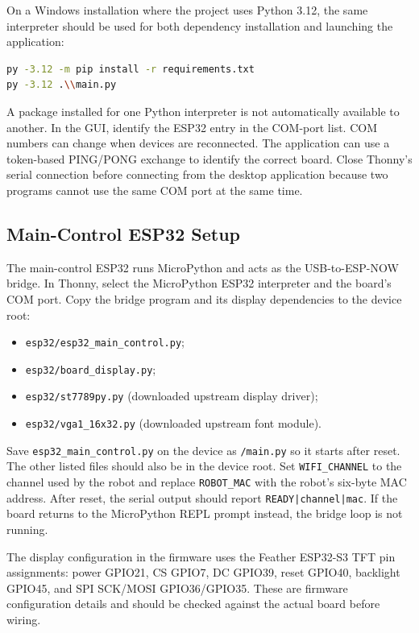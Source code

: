 \documentclass{article}
\begin{document}
On a Windows installation where the project uses Python 3.12, the same interpreter should be used for both dependency installation and launching the application:

\begin{lstlisting}[language=bash]
py -3.12 -m pip install -r requirements.txt
py -3.12 .\\main.py
\end{lstlisting}

A package installed for one Python interpreter is not automatically available to another. In the GUI, identify the ESP32 entry in the COM-port list. COM numbers can change when devices are reconnected. The application can use a token-based PING/PONG exchange to identify the correct board. Close Thonny's serial connection before connecting from the desktop application because two programs cannot use the same COM port at the same time.

\subsection{Main-Control ESP32 Setup}

The main-control ESP32 runs MicroPython and acts as the USB-to-ESP-NOW bridge. In Thonny, select the MicroPython ESP32 interpreter and the board's COM port. Copy the bridge program and its display dependencies to the device root:
\begin{itemize}
    \item \texttt{esp32/esp32\_main\_control.py};
    \item \texttt{esp32/board\_display.py};
    \item \texttt{esp32/st7789py.py} (downloaded upstream display driver);
    \item \texttt{esp32/vga1\_16x32.py} (downloaded upstream font module).
\end{itemize}

Save \texttt{esp32\_main\_control.py} on the device as \texttt{/main.py} so it starts after reset. The other listed files should also be in the device root. Set \texttt{WIFI\_CHANNEL} to the channel used by the robot and replace \texttt{ROBOT\_MAC} with the robot's six-byte MAC address. After reset, the serial output should report \texttt{READY|channel|mac}. If the board returns to the MicroPython REPL prompt instead, the bridge loop is not running.

The display configuration in the firmware uses the Feather ESP32-S3 TFT pin assignments: power GPIO21, CS GPIO7, DC GPIO39, reset GPIO40, backlight GPIO45, and SPI SCK/MOSI GPIO36/GPIO35. These are firmware configuration details and should be checked against the actual board before wiring.
\end{document}
